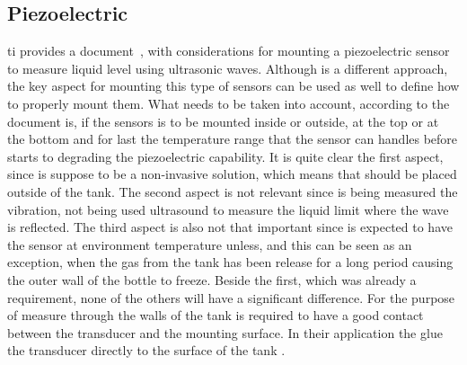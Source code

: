 \subsection{Piezoelectric}
\acrshort{ti} provides a document~\cite{minasiHowSelectMount2015}, with considerations for mounting a piezoelectric sensor to measure liquid level using ultrasonic waves. Although is a different approach, the key aspect for mounting this type of sensors can be used as well to define how to properly mount them. What needs to be taken into account, according to the document is, if the sensors is to be mounted inside or outside, at the top or at the bottom and for last the temperature range that the sensor can handles before starts to degrading the piezoelectric capability. It is quite clear the first aspect, since is suppose to be a non-invasive solution, which means that should be placed outside of the tank. The second aspect is not relevant since is being measured the vibration, not being used ultrasound to measure the liquid limit where the wave is reflected. The third aspect is also not that important since is expected to have the sensor at environment temperature unless, and this can be seen as an exception, when the gas from the tank has been release for a long period causing the outer wall of the bottle to freeze. Beside the first, which was already a requirement, none of the others will have a significant difference. For the purpose of measure through the walls of the tank is required to have a good contact between the transducer and the mounting surface. In their application the glue the transducer directly to the surface of the tank \cite{minasiHowSelectMount2015}.

